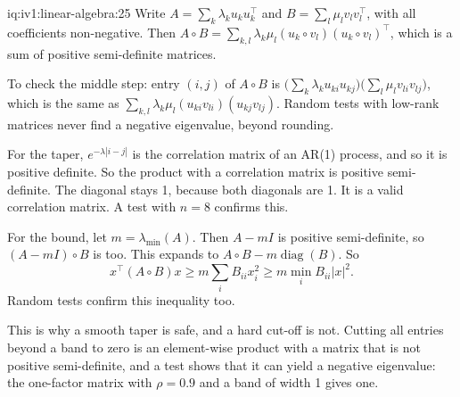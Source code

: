 \begin{solution}{iq:iv1:linear-algebra:25}
Write $A = \sum_k \lambda_ku_ku_k^\top$ and $B = \sum_l \mu_lv_lv_l^\top$, with all coefficients non-negative. Then $A \circ B = \sum_{k, l}\lambda_k\mu_l(u_k \circ v_l)(u_k \circ v_l)^\top$, which is a sum of positive semi-definite matrices.

To check the middle step: entry $(i, j)$ of $A \circ B$ is $\bigl(\sum_k\lambda_ku_{ki}u_{kj}\bigr)\bigl(\sum_l\mu_lv_{li}v_{lj}\bigr)$, which is the same as $\sum_{k, l}\lambda_k\mu_l(u_{ki}v_{li})(u_{kj}v_{lj})$. Random tests with low-rank matrices never find a negative eigenvalue, beyond rounding.

For the taper, $e^{-\lambda|i - j|}$ is the correlation matrix of an AR(1) process, and so it is positive definite. So the product with a correlation matrix is positive semi-definite. The diagonal stays 1, because both diagonals are 1. It is a valid correlation matrix. A test with $n = 8$ confirms this.

For the bound, let $m = \lambda_{\min}(A)$. Then $A - mI$ is positive semi-definite, so $(A - mI) \circ B$ is too. This expands to $A \circ B - m\operatorname{diag}(B)$. So
\[
x^\top(A \circ B)x \ge m\sum_i B_{ii}x_i^2 \ge m\min_iB_{ii}|x|^2.
\]
Random tests confirm this inequality too.

This is why a smooth taper is safe, and a hard cut-off is not. Cutting all entries beyond a band to zero is an element-wise product with a matrix that is not positive semi-definite, and a test shows that it can yield a negative eigenvalue: the one-factor matrix with $\rho = 0.9$ and a band of width 1 gives one.

\end{solution}
